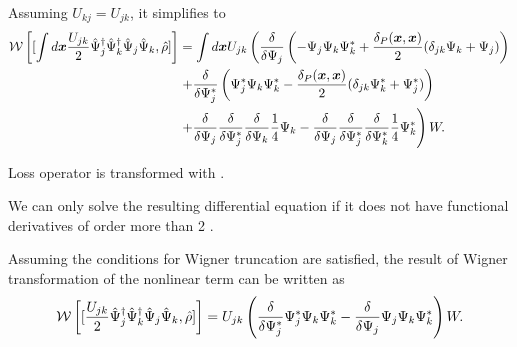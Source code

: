 Assuming $U_{kj} = U_{jk}$, it simplifies to
\begin{equation*}
\begin{split}
	\mathcal{W} \left[
		[
			\int d\boldsymbol{x} \frac{U_{jk}}{2}
				\hat{\Psi}_j^\dagger \hat{\Psi}_k^\dagger \hat{\Psi}_j \hat{\Psi}_k,
			\hat{\rho}
		]
	\right]
	& = \int d\boldsymbol{x} U_{jk} \left(
		\frac{\delta}{\delta \Psi_j} \left(
			- \Psi_j \Psi_k \Psi_k^*
			+ \frac{\delta_P(\boldsymbol{x}, \boldsymbol{x})}{2} ( \delta_{jk} \Psi_k + \Psi_j )
		\right) \right. \\
	&	\left. + \frac{\delta}{\delta \Psi_j^*} \left(
			\Psi_j^* \Psi_k \Psi_k^*
			- \frac{\delta_P(\boldsymbol{x}, \boldsymbol{x})}{2} ( \delta_{jk} \Psi_k^* + \Psi_j^* )
		\right) \right. \\
	&	\left.
			+ \frac{\delta}{\delta \Psi_j}
			\frac{\delta}{\delta \Psi_j^*}
			\frac{\delta}{\delta \Psi_k}
			\frac{1}{4} \Psi_k
			- \frac{\delta}{\delta \Psi_j}
			\frac{\delta}{\delta \Psi_j^*}
			\frac{\delta}{\delta \Psi_k^*}
			\frac{1}{4} \Psi_k^*
		\right) W.
\end{split}
\end{equation*}

Loss operator is transformed with .

We can only solve the resulting differential equation if it does not have functional derivatives of order more than 2 .

\begin{lemma}
Assuming the conditions for Wigner truncation are satisfied,
the result of Wigner transformation of the nonlinear term can be written as
\[
	\mathcal{W} \left[
		[
			\frac{U_{jk}}{2}
				\hat{\Psi}_j^\dagger \hat{\Psi}_k^\dagger \hat{\Psi}_j \hat{\Psi}_k,
			\hat{\rho}
		]
	\right]
	= U_{jk} \left(
		\frac{\delta}{\delta \Psi_j^*} \Psi_j^* \Psi_k \Psi_k^*
		- \frac{\delta}{\delta \Psi_j} \Psi_j \Psi_k \Psi_k^*
	\right) W.
\]
\end{lemma}

